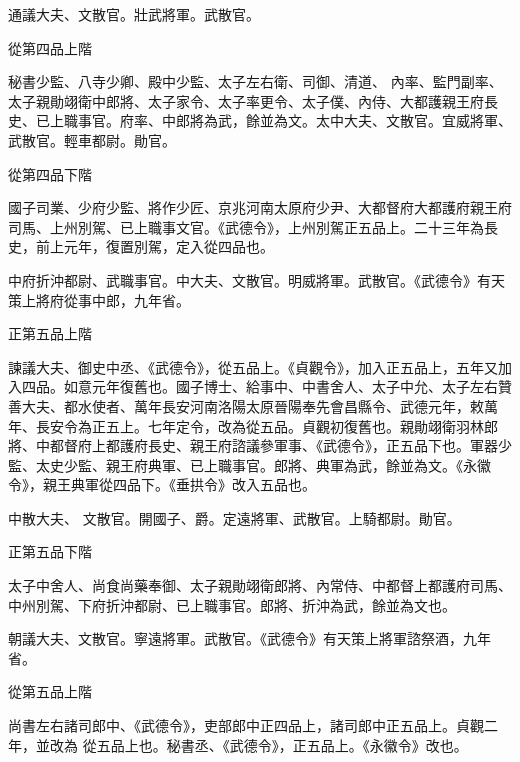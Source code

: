 \begin{pinyinscope}
 通議大夫、文散官。壯武將軍。武散官。



 從第四品上階



 秘書少監、八寺少卿、殿中少監、太子左右衛、司御、清道、
 內率、監門副率、太子親勛翊衛中郎將、太子家令、太子率更令、太子僕、內侍、大都護親王府長史、已上職事官。府率、中郎將為武，餘並為文。太中大夫、文散官。宜威將軍、武散官。輕車都尉。勛官。



 從第四品下階



 國子司業、少府少監、將作少匠、京兆河南太原府少尹、大都督府大都護府親王府司馬、上州別駕、已上職事文官。《武德令》，上州別駕正五品上。二十三年為長史，前上元年，復置別駕，定入從四品也。



 中府折沖都尉、武職事官。中大夫、文散官。明威將軍。武散官。《武德令》有天策上將府從事中郎，九年省。



 正第五品上階



 諫議大夫、御史中丞、《武德令》，從五品上。《貞觀令》，加入正五品上，五年又加入四品。如意元年復舊也。國子博士、給事中、中書舍人、太子中允、太子左右贊善大夫、都水使者、萬年長安河南洛陽太原晉陽奉先會昌縣令、武德元年，敕萬年、長安令為正五上。七年定令，改為從五品。貞觀初復舊也。親勛翊衛羽林郎將、中都督府上都護府長史、親王府諮議參軍事、《武德令》，正五品下也。軍器少監、太史少監、親王府典軍、已上職事官。郎將、典軍為武，餘並為文。《永徽令》，親王典軍從四品下。《垂拱令》改入五品也。



 中散大夫、
 文散官。開國子、爵。定遠將軍、武散官。上騎都尉。勛官。



 正第五品下階



 太子中舍人、尚食尚藥奉御、太子親勛翊衛郎將、內常侍、中都督上都護府司馬、中州別駕、下府折沖都尉、已上職事官。郎將、折沖為武，餘並為文也。



 朝議大夫、文散官。寧遠將軍。武散官。《武德令》有天策上將軍諮祭酒，九年省。



 從第五品上階



 尚書左右諸司郎中、《武德令》，吏部郎中正四品上，諸司郎中正五品上。貞觀二年，並改為
 從五品上也。秘書丞、《武德令》，正五品上。《永徽令》改也。




\end{pinyinscope}
